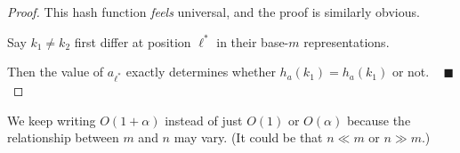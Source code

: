 \begin{proof}
    This hash function \emph{feels} universal, and the proof is similarly obvious.
    
    Say $k_1 \neq k_2$ first differ at position $\ell^*$ in their base-$m$ representations.
    
    Then the value of $a_{\ell^*}$ exactly determines whether $h_a(k_1) = h_a(k_1)$ or not. ~ $\blacksquare$
\end{proof}

\begin{remark}
    We keep writing $O(1 + \alpha)$ instead of just $O(1)$ or $O(\alpha)$ because the relationship between $m$ and $n$ may vary.  (It could be that $n \ll m$ or $n \gg m$.)
\end{remark}

